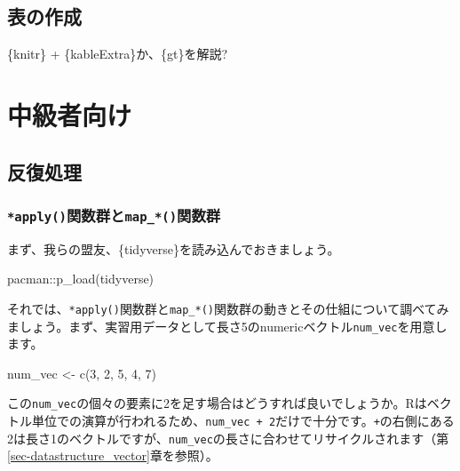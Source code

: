 \documentclass[
  a4paper,
  pandoc,
  ja=standard,
  jafont=haranoaji]{bxjsbook}
\newenvironment{Shaded}{\begin{snugshade}}{\end{snugshade}}
\newcommand{\DecValTok}[1]{\textcolor[rgb]{0.68,0.00,0.00}{#1}}
\newcommand{\FunctionTok}[1]{\textcolor[rgb]{0.28,0.35,0.67}{#1}}
\newcommand{\NormalTok}[1]{\textcolor[rgb]{0.00,0.48,0.65}{#1}}
\newcommand{\OtherTok}[1]{\textcolor[rgb]{0.00,0.48,0.65}{#1}}
\newcommand{\SpecialCharTok}[1]{\textcolor[rgb]{0.37,0.37,0.37}{#1}}
\begin{document}
\hypertarget{sec-table}{%
\chapter{表の作成}\label{sec-table}}

\{knitr\} + \{kableExtra\}か、\{gt\}を解説?

\part{中級者向け}

\hypertarget{sec-iteration}{%
\chapter{反復処理}\label{sec-iteration}}

\hypertarget{sec-iteration_intro}{%
\section{\texorpdfstring{\texttt{*apply()}関数群と\texttt{map\_*()}関数群}{*apply()関数群とmap\_*()関数群}}\label{sec-iteration_intro}}

まず、我らの盟友、\{tidyverse\}を読み込んでおきましょう。

\begin{Shaded}
\begin{Highlighting}[numbers=left,,]
\NormalTok{pacman}\SpecialCharTok{::}\FunctionTok{p\_load}\NormalTok{(tidyverse)}
\end{Highlighting}
\end{Shaded}

それでは、\texttt{*apply()}関数群と\texttt{map\_*()}関数群の動きとその仕組について調べてみましょう。まず、実習用データとして長さ5のnumericベクトル\texttt{num\_vec}を用意します。

\begin{Shaded}
\begin{Highlighting}[numbers=left,,]
\NormalTok{num\_vec }\OtherTok{\textless{}{-}} \FunctionTok{c}\NormalTok{(}\DecValTok{3}\NormalTok{, }\DecValTok{2}\NormalTok{, }\DecValTok{5}\NormalTok{, }\DecValTok{4}\NormalTok{, }\DecValTok{7}\NormalTok{)}
\end{Highlighting}
\end{Shaded}

この\texttt{num\_vec}の個々の要素に2を足す場合はどうすれば良いでしょうか。Rはベクトル単位での演算が行われるため、\texttt{num\_vec\ +\ 2}だけで十分です。\texttt{+}の右側にある2は長さ1のベクトルですが、\texttt{num\_vec}の長さに合わせてリサイクルされます（第\ref{sec-datastructure_vector}章を参照）。
\end{document}
